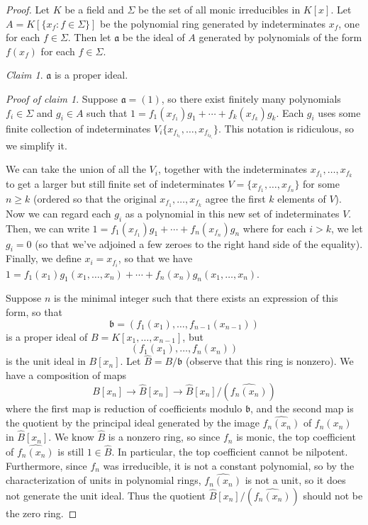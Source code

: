 \begin{proof}
Let $ K$ be a field and $ \Sigma$ be the set of all monic irreducibles in $ K[x]$. Let $ A = K[\{x_f : f \in \Sigma\}]$ be the polynomial ring generated by indeterminates $ x_f$, one for each $ f \in \Sigma$. Then let $ \mathfrak{a}$ be the ideal of $ A$ generated by polynomials of the form $ f(x_f)$ for each $ f \in \Sigma$.

\emph{Claim 1}. $ \mathfrak{a}$ is a proper ideal.

\emph{Proof of claim 1}. Suppose $ \mathfrak{a} = (1)$, so there exist finitely many polynomials $ f_i \in \Sigma$ and $ g_i \in A$ such that $ 1 = f_1(x_{f_1}) g_1 + \dotsb + f_k(x_{f_k}) g_k$. Each $ g_i$ uses some finite collection of indeterminates $ V_i \{x_{f_{i_1}}, \dotsc, x_{f_{i_{k_i}}}\}$. This notation is ridiculous, so we simplify it.

We can take the union of all the $ V_i$, together with the indeterminates $ x_{f_1}, \dotsc, x_{f_k}$ to get a larger but still finite set of indeterminates $ V = \{x_{f_1}, \dotsc, x_{f_n}\}$ for some $ n \geq k$ (ordered so that the original $ x_{f_1}, \dotsc, x_{f_k}$ agree the first $ k$ elements of $ V$). Now we can regard each $ g_i$ as a polynomial in this new set of indeterminates $ V$.
Then, we can write $ 1 = f_1(x_{f_1}) g_1 + \dotsb + f_n(x_{f_n}) g_n$ where for each $ i > k$, we let $ g_i = 0$ (so that we've adjoined a few zeroes to the right hand side of the equality).
Finally, we define $ x_i = x_{f_i}$, so that we have
$ 1 = f_1(x_1)g_1(x_1, \dotsc, x_n) + \dotsb + f_n(x_n) g_n(x_1, \dotsc, x_n)$.

Suppose $ n$ is the minimal integer such that there exists an expression of this form, so that
\[ \mathfrak{b} = (f_1(x_1), \dotsc, f_{n-1}(x_{n-1})) \]
is a proper ideal of $ B = K[x_1, \dotsc, x_{n-1}]$, but
\[ (f_1(x_1), \dotsc, f_n(x_n)) \]
is the unit ideal in $ B[x_n]$. Let $ \hat{B} = B/\mathfrak{b}$ (observe that this ring is nonzero). We have a composition of maps
\[ B[x_n] \to \hat{B}[x_n] \to \hat{B}[x_n]/(\widehat{f_n(x_n)}) \]
where the first map is reduction of coefficients modulo $ \mathfrak{b}$, and the second map is the quotient by the principal ideal generated by the image $ \widehat{f_n(x_n)}$ of $ f_n(x_n)$ in $ \hat{B}[x_n]$. We know $ \hat{B}$ is a nonzero ring, so since $ f_n$ is monic, the top coefficient of $ \widehat{f_n(x_n)}$ is still $ 1 \in \hat{B}$. In particular, the top coefficient cannot be nilpotent. Furthermore, since $ f_n$ was irreducible, it is not a constant polynomial, so by the characterization of units in polynomial rings, $ \widehat{f_n(x_n)}$ is not a unit, so it does not generate the unit ideal. Thus the quotient $ \hat{B}[x_n]/(\widehat{f_n(x_n)})$ should not be the zero ring.


\end{proof}
